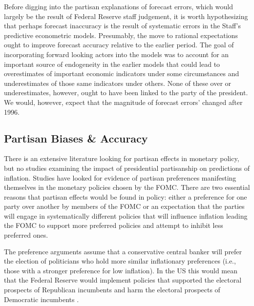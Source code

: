 \documentclass[a4paper]{article}
\begin{document}
Before digging into the partisan explanations of forecast errors, which would largely be the result of Federal Reserve staff judgement, it is worth hypothesizing that perhaps forecast inaccuracy is the result of systematic errors in the Staff's predictive econometric models. Presumably, the move to rational expectations ought to improve forecast accuracy relative to the earlier period. The goal of incorporating forward looking actors into the models was to account for an important source of endogeneity in the earlier models that could lead to overestimates of important economic indicators under some circumstances and underestimates of those same indicators under others. None of these over or underestimates, however, ought to have been linked to the party of the president. We would, however, expect that the magnitude of forecast errors' changed after 1996.



\subsection{Partisan Biases \& Accuracy}

There is an extensive literature looking for partisan effects in monetary policy, but no studies examining the impact of presidential partisanship on predictions of inflation. Studies have looked for evidence of partisan preferences manifesting themselves in the monetary policies chosen by the FOMC. There are two essential reasons that partisan effects would be found in policy: either a preference for one party over another by members of the FOMC or an expectation that the parties will engage in systematically different policies that will influence inflation leading the FOMC to support more preferred policies and attempt to inhibit less preferred ones. 

The preference arguments assume that a conservative central banker will prefer the election of politicians who hold more similar inflationary preferences (i.e., those with a stronger preference for low inflation). In the US this would mean that the Federal Reserve would implement policies that supported the electoral prospects of Republican incumbents and harm the electoral prospects of Democratic incumbents \citep{Clark2012,Hakes1988,Sieg1997,Tootell1996}.
\end{document}
